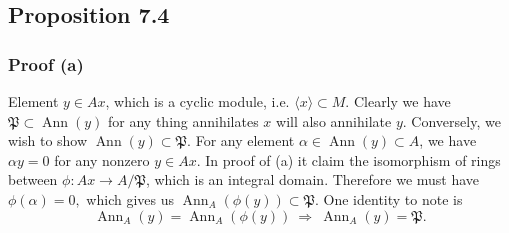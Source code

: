 \subsection{Proposition 7.4}

\subsubsection{Proof (a)}
Element $y\in Ax$, which is a cyclic module, i.e. $\langle x\rangle\subset M$.
Clearly we have $\mathfrak P\subset \operatorname{Ann}(y)$ for any thing annihilates $x$ will also annihilate $y$. 
Conversely, we wish to show $\operatorname{Ann}(y)\subset \mathfrak P$. For any element $\alpha\in \operatorname{Ann}(y)\subset A$, we have $\alpha y=0$ for any nonzero $y\in Ax$. In proof of (a) it claim the isomorphism of rings between $\phi:Ax\to A/\mathfrak P$, which is an integral domain. Therefore we must have $\phi(\alpha)=0,$ which gives us $\operatorname{Ann}_A(\phi(y))\subset \mathfrak P$. One identity to note is 
$$\operatorname{Ann}_A(y)=\operatorname{Ann}_A(\phi(y)) ~\Rightarrow~ \operatorname{Ann}_A(y)=\mathfrak P.$$